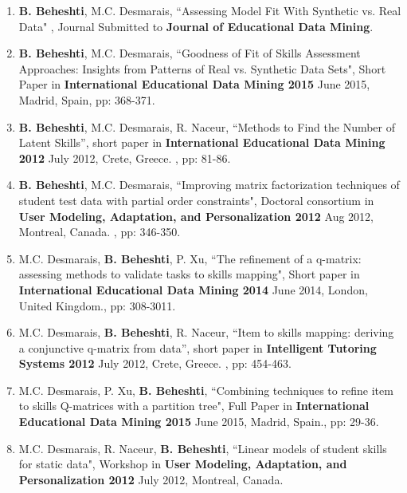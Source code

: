 \begin{enumerate}

\item \textbf{B. Beheshti}, M.C. Desmarais, “Assessing Model Fit With Synthetic vs. Real Data" , Journal Submitted to \textbf{Journal of Educational Data Mining}.

\item \textbf{B. Beheshti}, M.C. Desmarais, “Goodness of Fit of Skills Assessment Approaches: Insights from Patterns of Real vs. Synthetic Data Sets", Short Paper in \textbf{International Educational Data Mining 2015} June 2015, Madrid, Spain, pp: 368-371.

\item \textbf{B. Beheshti}, M.C. Desmarais, R. Naceur, “Methods to Find the Number of Latent Skills”, short paper in \textbf{International Educational Data Mining 2012} July 2012, Crete, Greece. , pp: 81-86.

\item \textbf{B. Beheshti}, M.C. Desmarais, “Improving matrix factorization techniques of student test data with partial order constraints", Doctoral consortium in \textbf{User Modeling, Adaptation, and Personalization 2012} Aug 2012, Montreal, Canada. , pp: 346-350.

\item M.C. Desmarais, \textbf{B. Beheshti}, P. Xu, “The refinement of a q-matrix: assessing methods to validate tasks to skills mapping", Short paper in \textbf{International Educational Data Mining 2014} June 2014, London, United Kingdom., pp: 308-3011.

\item M.C. Desmarais, \textbf{B. Beheshti}, R. Naceur, “Item to skills mapping: deriving a conjunctive q-matrix from data”, short paper in \textbf{Intelligent Tutoring Systems 2012} July 2012, Crete, Greece. , pp: 454-463.

\item M.C. Desmarais, P. Xu, \textbf{B. Beheshti}, “Combining techniques to refine item to skills Q-matrices with a partition tree", Full Paper in \textbf{International Educational Data Mining 2015} June 2015, Madrid, Spain., pp: 29-36.

\item M.C. Desmarais, R. Naceur, \textbf{B. Beheshti}, “Linear models of student skills for static data", Workshop in \textbf{User Modeling, Adaptation, and Personalization 2012} July 2012, Montreal, Canada.
\end{enumerate}


